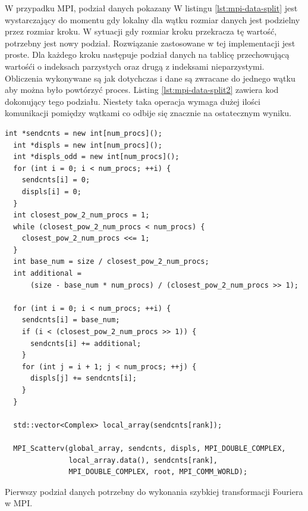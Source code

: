 \documentclass[a4paper,12pt]{book} %
\begin{document}
W przypadku MPI, podział danych pokazany W listingu \ref{lst:mpi-data-split} jest wystarczający do momentu gdy lokalny dla wątku rozmiar danych jest podzielny przez rozmiar kroku. W sytuacji gdy rozmiar kroku przekracza tę wartość, potrzebny jest nowy podział. Rozwiązanie zastosowane w tej implementacji jest proste. Dla każdego kroku następuje podział danych na tablicę przechowującą wartośći o indeksach  parzystych oraz drugą z indeksami nieparzystymi. Obliczenia wykonywane są jak dotychczas i dane są zwracane do jednego wątku aby można było powtórzyć proces. Listing \ref{lst:mpi-data-split2} zawiera kod dokonujący tego podziału. Niestety taka operacja wymaga dużej ilości komunikacji pomiędzy wątkami co odbije się znacznie na ostatecznym wyniku.

\begin{lstfloat}
\lstset{language=C++}
\begin{lstlisting}[frame=single]
  int *sendcnts = new int[num_procs]();
  int *displs = new int[num_procs]();
  int *displs_odd = new int[num_procs]();
  for (int i = 0; i < num_procs; ++i) {
    sendcnts[i] = 0;
    displs[i] = 0;
  }
  int closest_pow_2_num_procs = 1;
  while (closest_pow_2_num_procs < num_procs) {
    closest_pow_2_num_procs <<= 1;
  }
  int base_num = size / closest_pow_2_num_procs;
  int additional =
      (size - base_num * num_procs) / (closest_pow_2_num_procs >> 1);

  for (int i = 0; i < num_procs; ++i) {
    sendcnts[i] = base_num;
    if (i < (closest_pow_2_num_procs >> 1)) {
      sendcnts[i] += additional;
    }
    for (int j = i + 1; j < num_procs; ++j) {
      displs[j] += sendcnts[i];
    }
  }

  std::vector<Complex> local_array(sendcnts[rank]);

  MPI_Scatterv(global_array, sendcnts, displs, MPI_DOUBLE_COMPLEX,
               local_array.data(), sendcnts[rank],
               MPI_DOUBLE_COMPLEX, root, MPI_COMM_WORLD);
\end{lstlisting}
\caption{Pierwszy podział danych potrzebny do wykonania szybkiej transformacji Fouriera w MPI.}
\label{lst:mpi-data-split}
\end{lstfloat}
\end{document}
